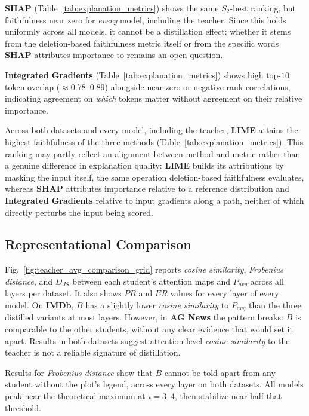 \documentclass[conference]{IEEEtran}
\begin{document}
\textbf{SHAP} (Table~\ref{tab:explanation_metrics}) shows the same $S_2$-best ranking, but faithfulness near zero for \emph{every} model, including the teacher. Since this holds uniformly across all models, it cannot be a distillation effect; whether it stems from the deletion-based faithfulness metric itself or from the specific words \textbf{SHAP} attributes importance to remains an open question.

\textbf{Integrated Gradients} (Table~\ref{tab:explanation_metrics}) shows high top-$10$ token overlap ($\approx0.78$--$0.89$) alongside near-zero or negative rank correlations, indicating agreement on \emph{which} tokens matter without agreement on their relative importance.

Across both datasets and every model, including the teacher, \textbf{LIME} attains the highest faithfulness of the three methods (Table~\ref{tab:explanation_metrics}). This ranking may partly reflect an alignment between method and metric rather than a genuine difference in explanation quality: \textbf{LIME} builds its attributions by masking the input itself, the same operation deletion-based faithfulness evaluates, whereas \textbf{SHAP} attributes importance relative to a reference distribution and \textbf{Integrated Gradients} relative to input gradients along a path, neither of which directly perturbs the input being scored.

\subsection{Representational Comparison}\label{sec:repr-comparison}

Fig.~\ref{fig:teacher_avg_comparison_grid} reports \textit{cosine similarity}, \textit{Frobenius distance}, and $D_{JS}$ between each student's attention maps and $P_{avg}$ across all layers per dataset. It also shows $PR$ and $ER$ values for every layer of every model. On \textbf{IMDb}, $B$ has a slightly lower \textit{cosine similarity} to $P_{avg}$ than the three distilled variants at most layers. However, in \textbf{AG News} the pattern breaks: $B$ is comparable to the other students, without any clear evidence that would set it apart. Results in both datasets suggest attention-level \textit{cosine similarity} to the teacher is not a reliable signature of distillation.

Results for \textit{Frobenius distance} show that $B$ cannot be told apart from any student without the plot's legend, across every layer on both datasets. All models peak near the theoretical maximum at $i=3$--$4$, then stabilize near half that threshold.
\end{document}
